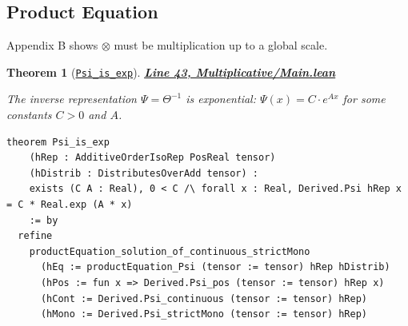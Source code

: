 \documentclass[11pt]{article}
\newtheorem{theorem}{Theorem}[section]
\theoremstyle{definition}
\theoremstyle{remark}
\begin{document}
\subsection{Product Equation}

Appendix B shows $\otimes$ must be multiplication up to a global scale.

\begin{theorem}[\href{https://github.com/zariuq/ks-foundations-of-inference/blob/main/KnuthSkilling/Multiplicative/Main.lean\#L43}{\texttt{Psi\_is\_exp}}]
\textbf{\href{https://github.com/zariuq/ks-foundations-of-inference/blob/main/KnuthSkilling/Multiplicative/Main.lean\#L43}{Line 43, Multiplicative/Main.lean}}

The inverse representation $\Psi = \Theta^{-1}$ is exponential:
$\Psi(x) = C \cdot e^{Ax}$ for some constants $C > 0$ and $A$.
\end{theorem}

\begin{lstlisting}[caption={Appendix B: $\Psi$ is exponential}]
theorem Psi_is_exp
    (hRep : AdditiveOrderIsoRep PosReal tensor)
    (hDistrib : DistributesOverAdd tensor) :
    exists (C A : Real), 0 < C /\ forall x : Real, Derived.Psi hRep x = C * Real.exp (A * x)
    := by
  refine
    productEquation_solution_of_continuous_strictMono
      (hEq := productEquation_Psi (tensor := tensor) hRep hDistrib)
      (hPos := fun x => Derived.Psi_pos (tensor := tensor) hRep x)
      (hCont := Derived.Psi_continuous (tensor := tensor) hRep)
      (hMono := Derived.Psi_strictMono (tensor := tensor) hRep)
\end{lstlisting}
\end{document}

